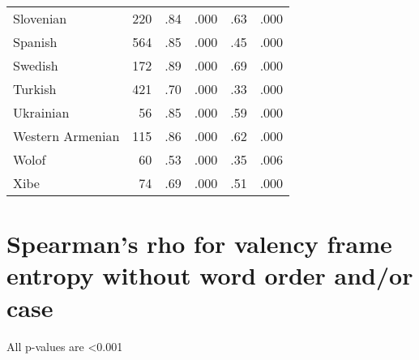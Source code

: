\begin{longtable}{lrrrrr}
    Slovenian & 220 & .84 & .000 & .63 & .000 \\
    Spanish & 564 & .85 & .000 & .45 & .000 \\
    Swedish & 172 & .89 & .000 & .69 & .000 \\
    Turkish & 421 & .70 & .000 & .33 & .000 \\
    Ukrainian & 56 & .85 & .000 & .59 & .000 \\
    Western Armenian & 115 & .86 & .000 & .62 & .000 \\
    Wolof & 60 & .53 & .000 & .35 & .006 \\
    Xibe & 74 & .69 & .000 & .51 & .000 \\
\end{longtable}
\section{Spearman's rho for valency frame entropy without word order and/or case}\label{appendix:exp3-corr}
All p-values are <0.001
